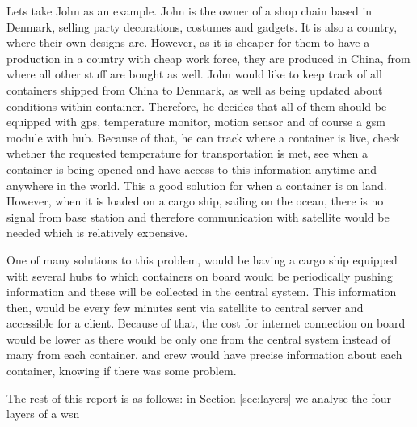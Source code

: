 Lets take John as an example. John is the owner of a shop chain based in Denmark, selling party decorations, costumes and gadgets. It is also a country, where their own designs are. However, as it is cheaper for them to have a production in a country with cheap work force, they are produced in China, from where all other stuff are bought as well. John would like to keep track of all containers shipped from China to Denmark, as well as being updated about conditions within container. Therefore, he decides that all of them should be equipped with \acrshort{gps}, temperature monitor, motion sensor and of course a \acrshort{gsm} module with hub. Because of that, he can track where a container is live, check whether the requested temperature for transportation is met, see when a container is being opened and have access to this information anytime and anywhere in the world. This a good solution for when a container is on land. However, when it is loaded on a cargo ship, sailing on the ocean, there is no signal from base station and therefore communication with satellite would be needed which is relatively expensive\footnotemark.
% 

One of many solutions to this problem, would be having a cargo ship equipped with several hubs to which containers on board would be periodically pushing information and these will be collected in the central system. This information then, would be every few minutes sent via satellite to central server and accessible for a client. Because of that, the cost for internet connection on board would be lower as there would be only one from the central system instead of many from each container, and crew would have precise information about each container, knowing if there was some problem.

The rest of this report is as follows: in Section \ref{sec:layers} we analyse the four layers of a \acrlong{wsn}